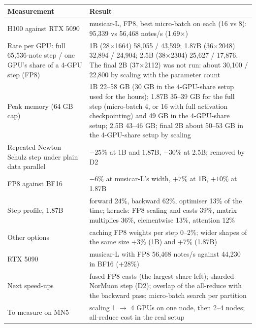 \documentclass[11pt,a4paper]{article}
\begin{document}
\begin{tabularx}{\textwidth}{|L{3.8cm}|X|}
\hline
\textbf{Measurement} & \textbf{Result}\\ \hline
H100 against RTX 5090 & musicar-L, FP8, best micro-batch on each (16 vs 8): 95,339 vs 56,468 notes/s (1.69$\times$)\\ \hline
Rate per GPU: full 65,536-note step / one GPU's share of a 4-GPU step (FP8) & 1B (28$\times$1664) 58,055 / 43,599;
1.87B (36$\times$2048) 32,894 / 24,904; 2.5B (38$\times$2304) 25,627 / 17,876. The final 2B (37$\times$2112) was not run:
about 30,100 / 22,800 by scaling with the parameter count\\ \hline
Peak memory (64 GB cap) & 1B 22--58 GB (30 GB in the 4-GPU-share setup used for the hours); 1.87B 35--39 GB for the
full step (micro-batch 4, or 16 with full activation checkpointing) and 49 GB in the 4-GPU-share setup; 2.5B 43--46
GB; final 2B about 50--53 GB in the 4-GPU-share setup by scaling\\ \hline
Repeated Newton--Schulz step under plain data parallel & $-25\%$ at 1B and 1.87B, $-30\%$ at 2.5B; removed by D2\\
\hline
FP8 against BF16 & $-6\%$ at musicar-L's width, $+7\%$ at 1B, $+10\%$ at 1.87B\\ \hline
Step profile, 1.87B & forward 24\%, backward 62\%, optimiser 13\% of the time; kernels: FP8 scaling and casts 39\%,
matrix multiplies 36\%, elementwise 13\%, attention 12\%\\ \hline
Other options & caching FP8 weights per step 0--2\%; wider shapes of the same size +3\% (1B) and +7\% (1.87B)\\ \hline
RTX 5090 & musicar-L with FP8 56,468 notes/s against 44,230 in BF16 ($+28\%$)\\ \hline
Next speed-ups & fused FP8 casts (the largest share left); sharded NorMuon step (D2); overlap of the all-reduce with
the backward pass; micro-batch search per partition\\ \hline
To measure on MN5 & scaling 1 $\to$ 4 GPUs on one node, then 2--4 nodes; all-reduce cost in the real setup\\ \hline
\end{tabularx}
\vspace{4pt}
\end{document}
